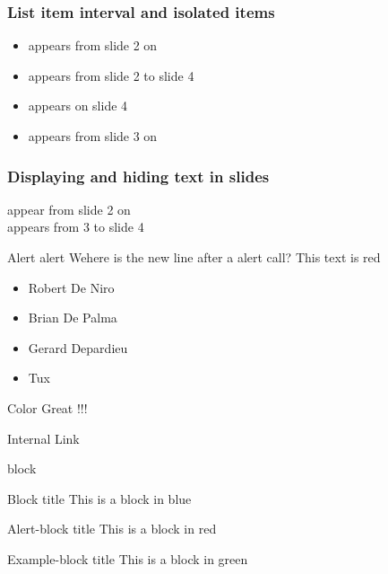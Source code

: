 \begin{frame}
  \frametitle{List item interval and isolated items}
  \begin{itemize}
  \item<2-> appears from slide 2 on
  \item<2-4> appears from slide 2 to slide 4
  \item<4> appears on slide 4
  \item<3-> appears from slide 3 on    
  \end{itemize}
\end{frame}

\begin{frame}
  \frametitle{Displaying and hiding text in slides}
  {appear from slide 2 on\\}
  {appears from 3 to slide 4\\}
\end{frame}

\begin{frame}{Alert}
  \alert{alert}
  Wehere is the new line after a alert call?
  \alert<1>{This text} \alert<2>{is} \alert<3>{red}
  \begin{itemize}
  \item <+-| alert@+> Robert De Niro
  \item <+-| alert@+> Brian De Palma
  \item <+-| alert@+> Gerard Depardieu
  \item <+-| alert@+> Tux
  \end{itemize}
\end{frame}

\begin{frame}{Color}
Great !!!
\end{frame}

\begin{frame}{Internal Link}
  \hyperlink{titlepage}{}
\end{frame}

\begin{frame}{block}

  \begin{block}{Block title}
    This is a block in blue
  \end{block}

  \begin{alertblock}{Alert-block title}
    This is a block in red
  \end{alertblock}

  \begin{exampleblock}{Example-block title}
    This is a block in green
  \end{exampleblock}
\end{frame}

